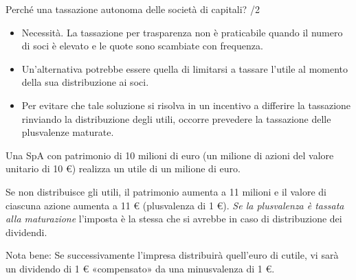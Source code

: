\documentclass[aspectratio=64,11pt]{beamer}
\begin{document}
\begin{frame}{Perché una tassazione autonoma delle società di capitali? /2}
\begin{itemize}
\item \alert{Necessità.} La tassazione per trasparenza non è praticabile quando il
numero di soci è elevato e le quote sono scambiate con frequenza.
\item Un'alternativa potrebbe essere quella di limitarsi a tassare l'utile al
momento della sua distribuzione ai soci.
\item Per evitare che tale soluzione si risolva in un incentivo a differire la
tassazione rinviando la distribuzione degli utili, occorre prevedere la
tassazione delle plusvalenze maturate.
\end{itemize}
\begin{block}{}
\small
Una SpA con patrimonio di 10 milioni di euro (un milione di azioni
del valore unitario di 10 €) realizza un utile di un milione di euro.

Se non distribuisce gli utili, il patrimonio aumenta a 11 milioni e il
valore di ciascuna azione aumenta a 11 € (plusvalenza di 1 €). \emph{Se la
plusvalenza è tassata alla maturazione} l'imposta è la stessa che si avrebbe
in caso di distribuzione dei dividendi.

Nota bene: Se successivamente l'impresa distribuirà quell'euro di
cutile, vi sarà un dividendo di 1 € «compensato» da una minusvalenza di 1 €.
\end{block}

\end{frame}
\end{document}
